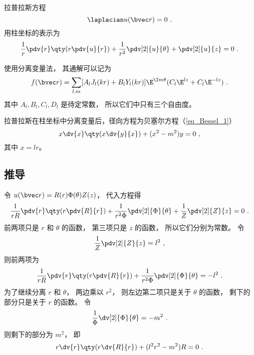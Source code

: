 

拉普拉斯方程
\begin{equation}
\laplacian u(\bvec r) = 0~.
\end{equation}
用柱坐标的表示为
\begin{equation}
\frac{1}{r}\pdv{r}\qty(r \pdv{u}{r}) + \frac{1}{r^2} \pdv[2]{u}{\theta} + \pdv[2]{u}{z} = 0~.
\end{equation}

使用分离变量法， 其通解可以记为
\begin{equation}
f(\bvec r) = \sum_{l,m} [A_l J_l(kr) + B_l Y_l(kr)]\E^{\I m \theta} (C_l\E^{lz} + C_l \E^{-lz})~.
\end{equation}
其中 $A_l, B_l, C_l, D_l$ 是待定常数， 所以它们中只有三个自由度。

拉普拉斯在柱坐标中分离变量后，径向方程为贝塞尔方程（\autoref{eq_Bessel_1}）
\begin{equation}
x \dv{x} \qty(x \dv{y}{x}) + (x^2 - m^2)y = 0~,
\end{equation}
其中 $x = lr$。

\subsection{推导}
令 $u(\bvec r) = R(r) \Phi(\theta) Z(z)$， 代入方程得
\begin{equation}
\frac{1}{rR}\pdv{r} \qty(r\pdv{R}{r}) + \frac{1}{r^2 \Phi} \pdv[2]{\Phi}{\theta} + \frac{1}{Z} \pdv[2]{Z}{z} = 0~.
\end{equation}
前两项只是 $r$ 和 $\theta $ 的函数， 第三项只是 $z$ 的函数， 所以它们分别为常数。 令
\begin{equation}\label{eq_CylLap_4}
\frac{1}{Z} \pdv[2]{Z}{z} = l^2~,
\end{equation}
则前两项为
\begin{equation}
\frac{1}{rR} \pdv{r} \qty(r\pdv{R}{r}) + \frac{1}{r^2 \Phi} \pdv[2]{\Phi}{\theta} =  - l^2~.
\end{equation}
为了继续分离 $r$ 和 $\theta$， 两边乘以 $r^2$，   则左边第二项只是关于 $\theta$  的函数， 剩下的部分只是关于 $r$ 的函数。 令
\begin{equation}\label{eq_CylLap_6}
\frac{1}{\Phi } \dv[2]{\Phi}{\theta} = -m^2~.
\end{equation}
则剩下的部分为 $m^2$， 即
\begin{equation}\label{eq_CylLap_7}
r \dv{r} \qty(r\dv{R}{r}) + (l^2 r^2 - m^2)R = 0~.
\end{equation}

